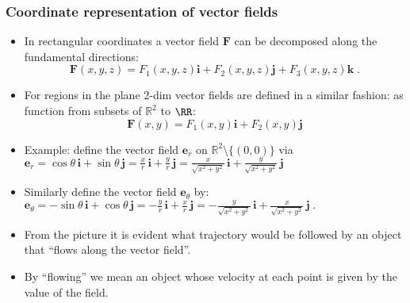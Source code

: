 \begin{frame}
\frametitle{Coordinate representation of vector fields}

\begin{itemize}
\item<1-> In rectangular coordinates a vector field $\textbf{F}$ can
be decomposed along the fundamental directions:
$$
\textbf{F}(x,y,z) = F_1(x,y,z) \textbf{i} + F_2(x,y,z) \textbf{j} + F_3(x,y,z) \textbf{k} \; .
$$
\item<2-> For regions in the plane 2-dim vector fields are defined in a similar fashion: as function from subsets of $\mathbb R^2$ to $\RR$:
$$
\textbf{F}(x,y) = F_1(x,y) \textbf{i} + F_2(x,y) \textbf{j}
$$


\end{itemize}
\end{frame}
\begin{frame}
\begin{itemize}
\item<1-> Example: define the vector field $\textbf{e}_r$ on $\mathbb{R}^2 \setminus \{ (0,0)\}$ via
$
\textbf{e}_r = \cos\theta\, \textbf{i} +
\sin\theta \,\textbf{j} = \frac{x}{r} \, \textbf{i} +
\frac{y}{r} \, \textbf{j} = \frac{x}{\sqrt{x^2+y^2}} \,
\textbf{i} + \frac{y}{\sqrt{x^2+y^2}} \, \textbf{j}
$

\item<2-> Similarly define the vector field $\textbf{e}_{\theta}$ by:
$\textbf{e}_\theta = -\sin\theta\, \textbf{i} +
\cos\theta \,\textbf{j} = -\frac{y}{r} \, \textbf{i} +
\frac{x}{r} \, \textbf{j} = -\frac{y}{\sqrt{x^2+y^2}} \,
\textbf{i} + \frac{x}{\sqrt{x^2+y^2}} \, \textbf{j} \; .
$
\item<4-> From the picture it is evident what trajectory would be followed by an object that ``\alert<5>{flows along the vector field}''.
\item<5-> By ``\alert<5>{flowing}'' we mean an object whose \alert<5>{velocity} at each point is given by \alert<5>{the value of the field}.
\end{itemize}
\end{frame}
